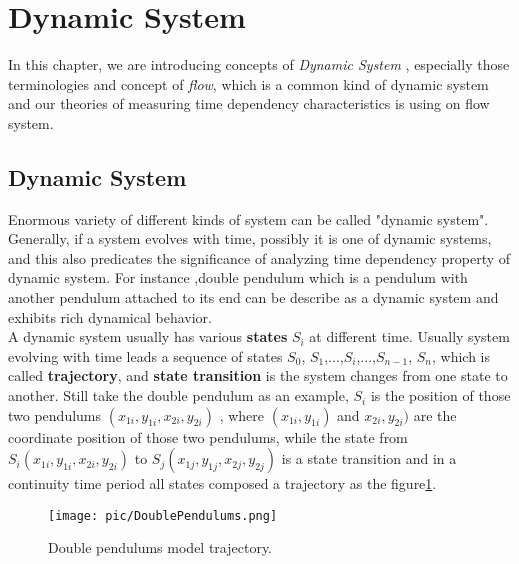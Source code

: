 \documentclass[
     11pt,         %
     a4paper,      %
     oneside,
     ]{article}
\begin{document}
	\section{Dynamic System}
	\label{sec:DynamicSystem}
	In this chapter, we are introducing concepts of \textit{Dynamic System }, especially those terminologies and concept of \textit{flow}, which is a common kind of dynamic system and our theories of measuring time dependency characteristics is using on flow system. \\
	\subsection{Dynamic System}
	Enormous variety of different kinds of system can be called "dynamic system". Generally, if a system evolves with time, possibly it is one of dynamic systems, and this also predicates the significance of analyzing time dependency property of dynamic system. For instance ,double pendulum which is a pendulum with another pendulum attached to its end can be describe as a dynamic system and exhibits rich dynamical behavior. \\
	
	A dynamic system usually has various \textbf{states} $S_{i}$ at different time. Usually system evolving with time leads a sequence of states $S_{0}$, $S_{1}$,...,$S_{i}$,...,$S_{n-1}$, $S_{n}$, which is called \textbf{trajectory}, and \textbf{state transition} is the system changes from one state to another. Still take the double pendulum as an example, $S_{i}$ is the position of those two pendulums $(x_{1i},y_{1i},x_{2i},y_{2i})$ , where $(x_{1i},y_{1i})$ and $x_{2i},y_{2i})$ are the coordinate position of those two pendulums, while the state from $S_{i}(x_{1i},y_{1i},x_{2i},y_{2i})$ to $S_{j}(x_{1j},y_{1j},x_{2j},y_{2j})$ is a state transition and in a continuity time period all states composed a trajectory as the figure\ref{fig:DoublePendulums}.\\
	\begin{figure}[H]
		\centering
		\texttt{[image: pic/DoublePendulums.png]}
		\caption{\tiny Double pendulums model trajectory.\cite{DoublePendulum} }
		\label{fig:DoublePendulums}
	\end{figure}
	
\end{document}
